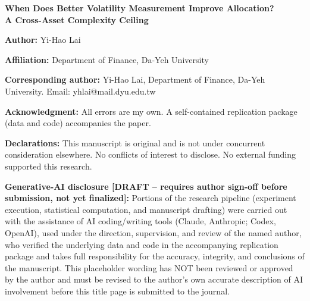 \documentclass[12pt,a4paper]{article}
\begin{document}
\thispagestyle{empty}

\begin{center}
{\Large\bfseries When Does Better Volatility Measurement Improve Allocation?\\
A Cross-Asset Complexity Ceiling}
\end{center}

\vspace{2em}

\noindent\textbf{Author:} Yi-Hao Lai

\noindent\textbf{Affiliation:} Department of Finance, Da-Yeh University

\noindent\textbf{Corresponding author:} Yi-Hao Lai, Department of Finance, Da-Yeh University. Email: yhlai@mail.dyu.edu.tw

\vspace{1em}

\noindent\textbf{Acknowledgment:} All errors are my own. A self-contained replication package (data and code) accompanies the paper.

\vspace{1em}

\noindent\textbf{Declarations:} This manuscript is original and is not under concurrent consideration elsewhere. No conflicts of interest to disclose. No external funding supported this research.

\vspace{1em}

\noindent\textbf{Generative-AI disclosure [DRAFT -- requires author sign-off before submission, not yet finalized]:} Portions of the research pipeline (experiment execution, statistical computation, and manuscript drafting) were carried out with the assistance of AI coding/writing tools (Claude, Anthropic; Codex, OpenAI), used under the direction, supervision, and review of the named author, who verified the underlying data and code in the accompanying replication package and takes full responsibility for the accuracy, integrity, and conclusions of the manuscript. This placeholder wording has NOT been reviewed or approved by the author and must be revised to the author's own accurate description of AI involvement before this title page is submitted to the journal.
\end{document}
